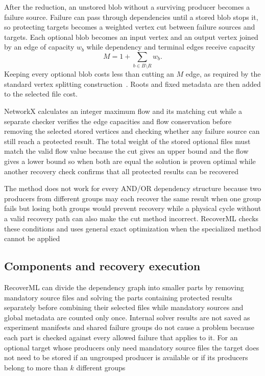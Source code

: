 After the reduction, an unstored blob without a surviving producer becomes a failure source. Failure can pass through dependencies until a stored blob stops it, so protecting targets becomes a weighted vertex cut between failure sources and targets. Each optional blob becomes an input vertex and an output vertex joined by an edge of capacity $w_b$ while dependency and terminal edges receive capacity
\begin{equation}
  M=1+\sum_{b\in B\setminus R}w_b.
\end{equation}
Keeping every optional blob costs less than cutting an $M$ edge, as required by the standard vertex splitting construction~\cite{flow,ahuja1993flow}. Roots and fixed metadata are then added to the selected file cost.

NetworkX calculates an integer maximum flow and its matching cut while a separate checker verifies the edge capacities and flow conservation before removing the selected stored vertices and checking whether any failure source can still reach a protected result. The total weight of the stored optional files must match the valid flow value because the cut gives an upper bound and the flow gives a lower bound so when both are equal the solution is proven optimal while another recovery check confirms that all protected results can be recovered

The method does not work for every AND/OR dependency structure because two producers from different groups may each recover the same result when one group fails but losing both groups would prevent recovery while a physical cycle without a valid recovery path can also make the cut method incorrect. RecoverML checks these conditions and uses general exact optimization when the specialized method cannot be applied

\subsection{Components and recovery execution}

RecoverML can divide the dependency graph into smaller parts by removing mandatory source files and solving the parts containing protected results separately before combining their selected files while mandatory sources and global metadata are counted only once. Internal solver results are not saved as experiment manifests and shared failure groups do not cause a problem because each part is checked against every allowed failure that applies to it. For an optional target whose producers only need mandatory source files the target does not need to be stored if an ungrouped producer is available or if its producers belong to more than $k$ different groups

